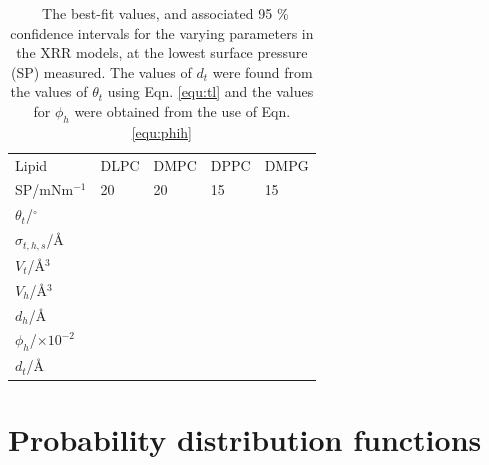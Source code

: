 \documentclass[11pt,a4paper]{article}
\begin{document}
\begin{table}
	\caption{\ The best-fit values, and associated 95 \% confidence intervals for the varying parameters in the XRR models, at the lowest surface pressure (SP) measured. The values of $d_t$ were found from the values of $\theta_t$ using Eqn. \ref{equ:tl} and the values for $\phi_h$ were obtained from the use of Eqn. \ref{equ:phih}}
	\label{tab:liptab3}
	\begin{tabular*}{0.48\textwidth}{@{\extracolsep{\fill}}lllll}
		\hline
		Lipid & DLPC & DMPC & DPPC & DMPG \\
    SP/mNm$^{-1}$ & 20 & 20 & 15 & 15 \\
		\hline
		$\theta_t$/$^\circ$ &  &  &  &  \\
		$\sigma_{t,h,s}$/\AA &  &  &  &  \\
    \hline
    $V_t$/\AA$^3$ &  &  &  &  \\
		$V_h$/\AA$^3$ &  &  &  &  \\
		$d_h$/\AA &  &  &  &  \\
    \hline
    $\phi_h$/$\times10^{-2}$ &  &  &  &  \\
		$d_t$/\AA &  &  &  &  \\
		\hline
	\end{tabular*}
\end{table}
%

\section{Probability distribution functions}
\end{document}

